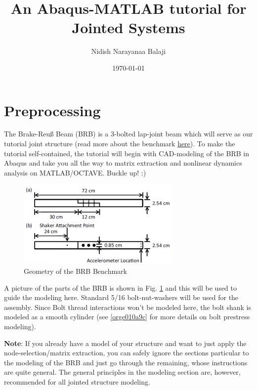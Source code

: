 \documentclass[11pt]{article}
\author{Nidish Narayanaa Balaji}
\date{\today}
\title{An Abaqus-MATLAB tutorial for Jointed Systems}
\begin{document}
\maketitle
\tableofcontents


\section{Preprocessing}
\label{sec:orgb7b3f30}

The Brake-Reuß Beam (BRB) is a 3-bolted lap-joint beam which will serve as our tutorial joint structure (read more about the benchmark \href{https://jointmechanics.org/index.php/Benchmarks\#The\_Brake-Reu\%C3\%9F\_Beams}{here}).
To make the tutorial self-contained, the tutorial will begin with CAD-modeling of the BRB in Abaqus and take you all the way to matrix extraction and nonlinear dynamics analysis on MATLAB/OCTAVE.
Buckle up! :)

\begin{figure}[htbp]
\centering
\includegraphics[width=.9\linewidth]{./figs/300px-BRB.png}
\caption{\label{fig:org44074c3}Geometry of the BRB Benchmark}
\end{figure}

A picture of the parts of the BRB is shown in Fig. \ref{fig:org44074c3} and this will be used to guide the modeling here.
Standard 5/16 bolt-nut-washers will be used for the assembly. Since Bolt thread interactions won't be modeled here, the bolt shank is modeled as a smooth cylinder (see \ref{orge010a9c} for more details on bolt prestress modeling).

\textbf{Note}: If you already have a model of your structure and want to just apply the node-selection/matrix extraction, you can safely ignore the sections particular to the modeling of the BRB and just go through the remaining, whose instructions are quite general.
The general principles in the modeling section are, however, recommended for all jointed structure modeling.
\end{document}
